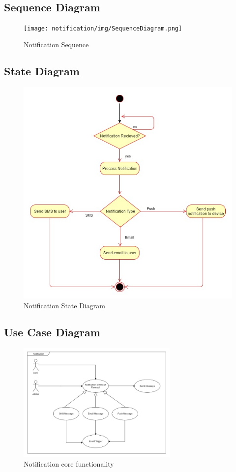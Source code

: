 \subsection{Sequence Diagram}

\begin{figure}[H]
	\centering
	\texttt{[image: notification/img/SequenceDiagram.png]}
	\caption{Notification Sequence}
\end{figure}



\subsection{State Diagram}

\begin{figure}[H]
	\centering
	\includegraphics[width=\textwidth]{notification/img/NotificationState.jpg}
	\caption{Notification State Diagram}
\end{figure}




\subsection{Use Case Diagram}

\begin{figure}[H]
	\centering
	\includegraphics[width=0.7\textwidth]{notification/img/NotificationUseCase.jpg}
	\caption{Notification core functionality }
\end{figure}

